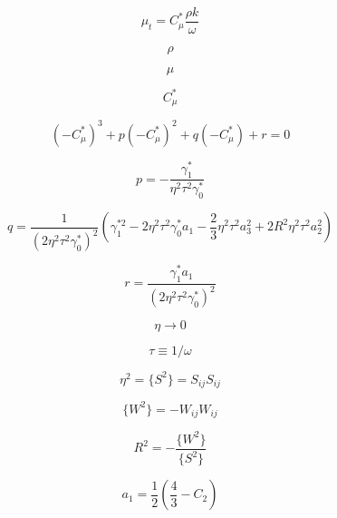 \begin{equation}
\mu_t = C_{\mu}^* \frac{\rho k}{\omega}
\end{equation}

\begin{equation}
\rho
\end{equation}

\begin{equation}
\mu
\end{equation}

\begin{equation}
C_{\mu}^*
\end{equation}

\begin{equation}
(-C_{\mu}^*)^3 + p(-C_{\mu}^*)^2 + q(-C_{\mu}^*) + r = 0
\end{equation}

\begin{equation}
p = - \frac{\gamma_1^*}{\eta^2 \tau^2 \gamma_0^*}
\end{equation}

\begin{equation}
q = \frac{1}{(2 \eta^2 \tau^2 \gamma_0^*)^2} \left( \gamma_1^{*2} - 2 \eta^2 \tau^2 \gamma_0^* a_1
  -\frac{2}{3} \eta^2 \tau^2 a_3^2 + 2 R^2 \eta^2 \tau^2 a_2^2 \right)
\end{equation}

\begin{equation}
r = \frac{\gamma_1^* a_1}{(2 \eta^2 \tau^2 \gamma_0^*)^2}
\end{equation}

\begin{equation}
\eta \rightarrow 0
\end{equation}

\begin{equation}
\tau \equiv 1 / \omega
\end{equation}

\begin{equation}
\eta^2 = \lbrace S^2 \rbrace = S_{ij}S_{ij}
\end{equation}

\begin{equation}
\lbrace W^2 \rbrace = -W_{ij}W_{ij}
\end{equation}

\begin{equation}
R^2 = - \frac{\lbrace W^2 \rbrace}{\lbrace S^2 \rbrace}
\end{equation}

\begin{equation}
a_1 = \frac{1}{2} \left( \frac{4}{3} - C_2 \right)
\end{equation}

